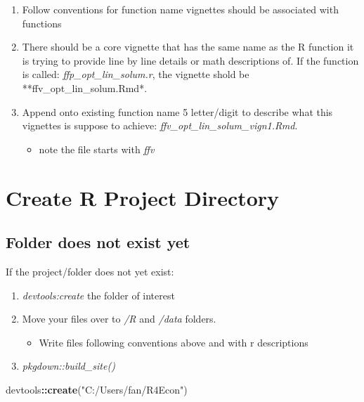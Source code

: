 \documentclass[
]{article}
\newenvironment{Shaded}{\begin{snugshade}}{\end{snugshade}}
\newcommand{\KeywordTok}[1]{\textcolor[rgb]{0.13,0.29,0.53}{\textbf{#1}}}
\newcommand{\NormalTok}[1]{#1}
\newcommand{\OperatorTok}[1]{\textcolor[rgb]{0.81,0.36,0.00}{\textbf{#1}}}
\newcommand{\StringTok}[1]{\textcolor[rgb]{0.31,0.60,0.02}{#1}}
\providecommand{\tightlist}{%
  \setlength{\itemsep}{0pt}\setlength{\parskip}{0pt}}
\begin{document}
\begin{enumerate}
\def\labelenumi{\arabic{enumi}.}
\tightlist
\item
  Follow conventions for function name vignettes should be associated
  with functions
\item
  There should be a core vignette that has the same name as the R
  function it is trying to provide line by line details or math
  descriptions of. If the function is called:
  \emph{ffp\_opt\_lin\_solum.r}, the vignette shold be
  **ffv\_opt\_lin\_solum.Rmd*.
\item
  Append onto existing function name 5 letter/digit to describe what
  this vignettes is suppose to achieve:
  \emph{ffv\_opt\_lin\_solum\_vign1.Rmd}.

  \begin{itemize}
  \tightlist
  \item
    note the file starts with \emph{ffv}
  \end{itemize}
\end{enumerate}

\hypertarget{create-r-project-directory}{%
\section{Create R Project Directory}\label{create-r-project-directory}}

\hypertarget{folder-does-not-exist-yet}{%
\subsection{Folder does not exist yet}\label{folder-does-not-exist-yet}}

If the project/folder does not yet exist:

\begin{enumerate}
\def\labelenumi{\arabic{enumi}.}
\tightlist
\item
  \emph{devtools:create} the folder of interest
\item
  Move your files over to \emph{/R} and \emph{/data} folders.

  \begin{itemize}
  \tightlist
  \item
    Write files following conventions above and with r descriptions
  \end{itemize}
\item
  \emph{pkgdown::build\_site()}
\end{enumerate}

\begin{Shaded}
\begin{Highlighting}[]
\NormalTok{devtools}\OperatorTok{::}\KeywordTok{create}\NormalTok{(}\StringTok{"C:/Users/fan/R4Econ"}\NormalTok{)}
\end{Highlighting}
\end{Shaded}
\end{document}
